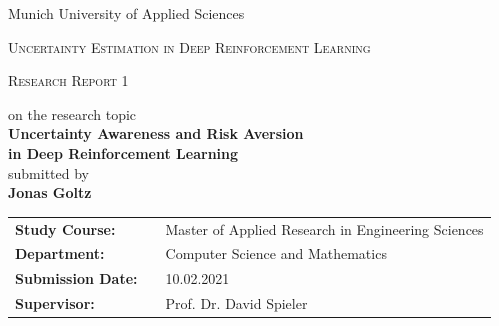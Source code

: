 \documentclass[11pt,a4paper]{article}
\begin{document}
	\begin{center}
	Munich University of Applied Sciences \\
	\end{center}
	\vspace{1.5cm}
	\noindent\hrulefill
	\begin{center}
		\LARGE{\textsc{
			Uncertainty Estimation in Deep Reinforcement Learning\\
		}}
	\end{center}
	\vspace{0.1cm}
	\begin{center}
		\textsc{
			\Large{Research Report 1}
		}
	\end{center}
	\noindent\hrulefill
	\vspace{1cm}


	\begin{center}
		\small {on the research topic}\\
		\large{\textbf{
			Uncertainty Awareness and Risk Aversion\\in Deep Reinforcement Learning\\
		}}
	\vspace{2cm}
	\small{submitted by} \\
	\large{\textbf{Jonas Goltz}}
	\end{center}
	\vspace{7.5cm}


	\begin{center}
		\begin{tabular}{lll}
			\textbf{Study Course:} & &Master of Applied Research in Engineering Sciences\\
			\textbf{Department:} & &Computer Science and Mathematics\\
			\textbf{Submission Date:} & &10.02.2021\\
			\textbf{Supervisor:} & &Prof. Dr. David Spieler
		\end{tabular}
	\end{center}


	\newpage
\end{document}
